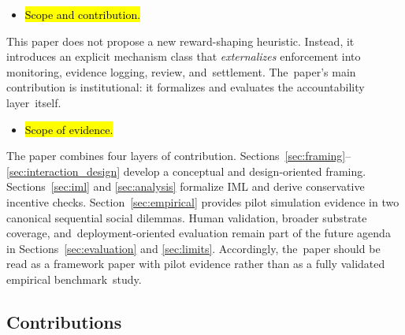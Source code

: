 \documentclass[mca,article,accept,pdftex,oneauthor]{Definitions/mdpi}
\begin{document}
\begin{itemize}[leftmargin=-0.5pt, label={}]
\item {\hl{Scope and contribution.}}
\end{itemize}

This paper does not propose a new reward-shaping heuristic. Instead, it introduces an explicit mechanism class that \emph{externalizes} enforcement into monitoring, evidence logging, review, and~settlement. The~paper's main contribution is institutional: it formalizes and evaluates the accountability layer~itself.

\begin{itemize}[leftmargin=-0.5pt, label={}]
\item {\hl{Scope of evidence.}}
\end{itemize}

The paper combines four layers of contribution. Sections~\ref{sec:framing}--\ref{sec:interaction_design} develop a conceptual and design-oriented framing. Sections~\ref{sec:iml} and \ref{sec:analysis} formalize IML and derive conservative incentive checks. Section~\ref{sec:empirical} provides pilot simulation evidence in two canonical sequential social dilemmas. Human validation, broader substrate coverage, and~deployment-oriented evaluation remain part of the future agenda in Sections~\ref{sec:evaluation} and \ref{sec:limits}. Accordingly, the~paper should be read as a framework paper with pilot evidence rather than as a fully validated empirical benchmark~study.

\subsection{Contributions}
\label{sec:contrib}
\end{document}
